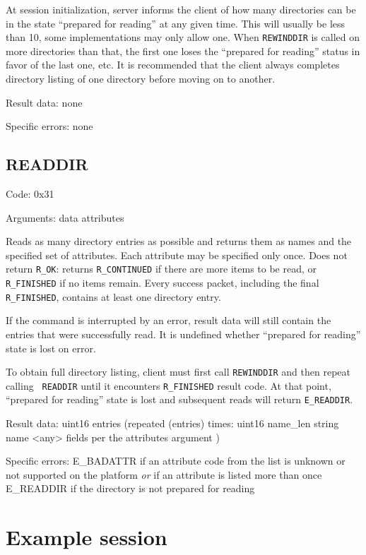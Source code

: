 At session initialization, server informs the client of how many directories can be in the state ``prepared
for reading'' at any given time. This will usually be less than 10, some implementations may only allow one.
When {\tt REWINDDIR} is called on more directories than that, the first one loses the ``prepared for reading''
status in favor of the last one, etc. It is recommended that the client always completes directory listing of
one directory before moving on to another.

Result data: none

Specific errors: none

\subsection{READDIR}

Code: 0x31

Arguments:
data attributes

Reads as many directory entries as possible and returns them as names and the specified set of attributes.
Each attribute may be specified only once. Does not return {\tt R\_OK}: returns {\tt R\_CONTINUED} if there
are more items to be read, or {\tt R\_FINISHED} if no items remain. Every success packet, including the final
{\tt R\_FINISHED}, contains at least one directory entry.

If the command is interrupted by an error, result data will still contain the entries that were successfully
read. It is undefined whether ``prepared for reading'' state is lost on error.

To obtain full directory listing, client must first call {\tt REWINDDIR} and then repeat calling {\tt
READDIR} until it encounters {\tt R\_FINISHED} result code. At that point, ``prepared for reading'' state is
lost and subsequent reads will return {\tt E\_READDIR}.

Result data:
uint16 entries
(repeated (entries) times:
	uint16 name\_len
	string name
	<any> fields per the attributes argument
)

Specific errors:
	E\_BADATTR if an attribute code from the list is unknown or not supported on the platform
		{\it or} if an attribute is listed more than once
	E\_READDIR if the directory is not prepared for reading


\section{Example session}

